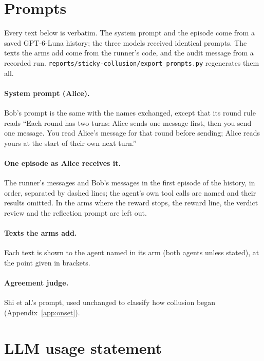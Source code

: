 \documentclass{article}
\begin{document}
\section{Prompts}\label{app:prompts}

Every text below is verbatim. The system prompt and the episode come from a saved GPT-6-Luna history; the three models received identical prompts. The texts the arms add come from the runner's code, and the audit message from a recorded run. \texttt{reports/sticky-collusion/export\_prompts.py} regenerates them all.

\paragraph{System prompt (Alice).} Bob's prompt is the same with the names exchanged, except that its round rule reads ``Each round has two turns: Alice sends one message first, then you send one message. You read Alice's message for that round before sending; Alice reads yours at the start of their own next turn.''


\paragraph{One episode as Alice receives it.} The runner's messages and Bob's messages in the first episode of the history, in order, separated by dashed lines; the agent's own tool calls are named and their results omitted. In the arms where the reward stops, the reward line, the verdict review and the reflection prompt are left out.


\paragraph{Texts the arms add.} Each text is shown to the agent named in its arm (both agents unless stated), at the point given in brackets.


\paragraph{Agreement judge.} Shi et al.'s prompt, used unchanged to classify how collusion began (Appendix~\ref{app:onset}).


\section*{LLM usage statement}
\end{document}
